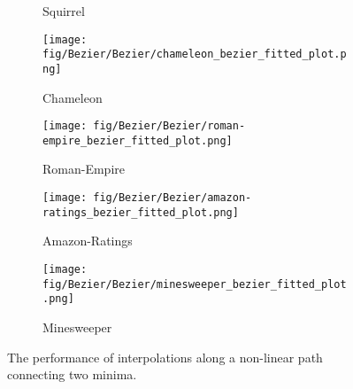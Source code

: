 \begin{figure*}[!ht]
\begin{subfigure}[b]{0.24\textwidth}
        \caption{Squirrel}
    \end{subfigure}
    \begin{subfigure}[b]{0.24\textwidth}
        \texttt{[image: fig/Bezier/Bezier/chameleon\_bezier\_fitted\_plot.png]}
        \caption{Chameleon}
    \end{subfigure}
    \begin{subfigure}[b]{0.24\textwidth}
        \texttt{[image: fig/Bezier/Bezier/roman-empire\_bezier\_fitted\_plot.png]}
        \caption{Roman-Empire}
    \end{subfigure}
    \begin{subfigure}[b]{0.24\textwidth}
        \texttt{[image: fig/Bezier/Bezier/amazon-ratings\_bezier\_fitted\_plot.png]}
        \caption{Amazon-Ratings }
    \end{subfigure}
        \begin{subfigure}[b]{0.24\textwidth}
        \texttt{[image: fig/Bezier/Bezier/minesweeper\_bezier\_fitted\_plot.png]}
        \caption{Minesweeper}
    \end{subfigure}
    \caption{The performance of interpolations along a non-linear path connecting two minima.}
    \label{fig:A2}
\end{figure*}
\clearpage



